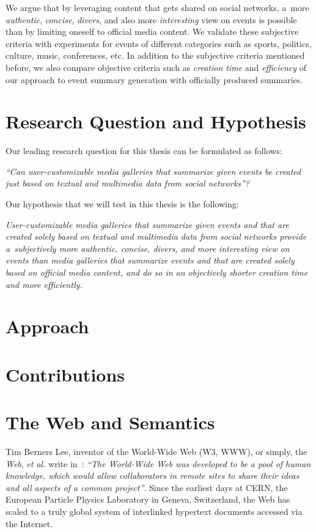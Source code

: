 We argue that by leveraging content that gets shared on social networks,
a~more \emph{authentic}, \emph{concise}, \emph{divers}, and also more \emph{interesting}
view on events is possible than by limiting oneself to official media content.
We validate these subjective criteria with experiments for events of different categories
such as sports, politics, culture, music, conferences, etc.
In addition to the subjective criteria mentioned before,
we also compare objective criteria such as \emph{creation time} and \emph{efficiency}
of our approach to event summary generation with officially produced summaries.




\section{Research Question and Hypothesis}
Our leading research question for this thesis can be formulated as follows:
 
\textit{``Can user-customizable media galleries that summarize given events
be created just based on textual and multimedia data from social networks''?}

\noindent Our hypothesis that we will test in this thesis is the following:

\textit{User-customizable media galleries that summarize given events and
that are created solely based on textual and multimedia data from social networks
provide a~subjectively more \emph{authentic}, \emph{concise}, \emph{divers},
and more \emph{interesting} view on events than media galleries that summarize events
and that are created solely based on official media content,
and do so in an objectively \emph{shorter} creation time and more \emph{efficiently}.}

\section{Approach}

\section{Contributions}

\section{The Web and Semantics}
Tim Berners Lee, inventor of the World-Wide Web (W3, WWW), or simply, the \emph{Web}, \emph{et al.}
write in~\cite{BernersLee1994}: \textit{``The World-Wide Web was developed
to be a pool of human knowledge, which would allow collaborators
in remote sites to share their ideas
and all aspects of a common project''}.
Since the earliest days at CERN,
the European Particle Physics Laboratory in Geneva, Switzerland,
the Web has scaled to a truly global system of interlinked hypertext documents
accessed via the Internet.

